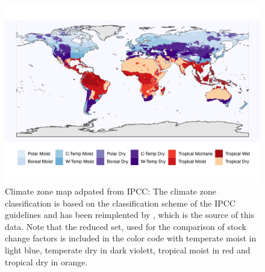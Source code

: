 \documentclass[gc, manuscript]{copernicus}
\begin{document}
\begin{figure}[h]
\includegraphics[width=13cm]{../ResultNotebooks/Output/Images/climatezones} 
\caption{Climate zone map adpated from IPCC: The climate zone classification is based on the classification scheme of the IPCC guidelines \citep{eggleston_ipcc_2006} and has been reimplented by \citet{carre_background_2010}, which is the source of this data. Note that the reduced set, used for the comparison of stock change factors is included in the color code with temperate moist in light blue, temperate dry in dark violett, tropical moist in red and tropical dry in orange.}
\label{fig:CLIMzone}
\end{figure}
\end{document}

